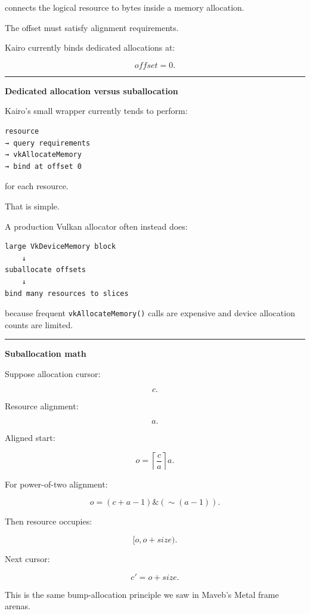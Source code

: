 connects the logical resource to bytes inside a memory allocation.

The offset must satisfy alignment requirements.

Kairo currently binds dedicated allocations at:

\[
offset=0.
\]

\begin{center}\rule{0.5\linewidth}{0.5pt}\end{center}

\textbf{Dedicated allocation versus suballocation}

Kairo's small wrapper currently tends to perform:

\begin{verbatim}
resource
→ query requirements
→ vkAllocateMemory
→ bind at offset 0
\end{verbatim}

for each resource.

That is simple.

A production Vulkan allocator often instead does:

\begin{verbatim}
large VkDeviceMemory block
    ↓
suballocate offsets
    ↓
bind many resources to slices
\end{verbatim}

because frequent \texttt{vkAllocateMemory()} calls are expensive and device allocation counts are limited.

\begin{center}\rule{0.5\linewidth}{0.5pt}\end{center}

\textbf{Suballocation math}

Suppose allocation cursor:

\[
c.
\]

Resource alignment:

\[
a.
\]

Aligned start:

\[
\boxed{
o=
\left\lceil
\frac ca
\right\rceil a.
}
\]

For power-of-two alignment:

\[
\boxed{
o=
(c+a-1)\&( \sim(a-1)).
}
\]

Then resource occupies:

\[
[o,o+size).
\]

Next cursor:

\[
c'=o+size.
\]

This is the same bump-allocation principle we saw in Maveb's Metal frame arenas.


